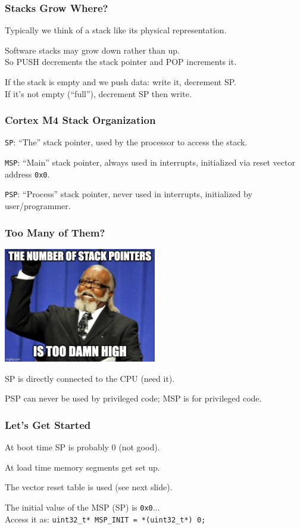 \begin{frame}
\frametitle{Stacks Grow Where?}

Typically we think of a stack like its physical representation.

Software stacks may grow down rather than up.\\
\quad So PUSH decrements the stack pointer and POP increments it.

If the stack is empty and we push data: write it, decrement SP.\\
\quad If it's not empty (``full''), decrement SP then write.

\end{frame}



\begin{frame}
\frametitle{Cortex M4 Stack Organization}

\texttt{SP}: ``The'' stack pointer, used by the processor to access the stack.

\texttt{MSP}: ``Main'' stack pointer, always used in interrupts, initialized via reset vector address \texttt{0x0}.

\texttt{PSP}: ``Process'' stack pointer, never used in interrupts, initialized by user/programmer.


\end{frame}


\begin{frame}
\frametitle{Too Many of Them?}

\begin{center}
	\includegraphics[width=0.5\textwidth]{images/sptdh.jpg}
\end{center}

SP is directly connected to the CPU (need it).

PSP can never be used by privileged code; MSP is for privileged code.

\end{frame}


\begin{frame}
\frametitle{Let's Get Started}

At boot time SP is probably 0 (not good).

At load time memory segments get set up.

The vector reset table is used (see next slide).

The initial value of the MSP (SP) is \texttt{0x0}...\\
\quad Access it as: \texttt{uint32\_t* MSP\_INIT = *(uint32\_t*) 0;}

\end{frame}



